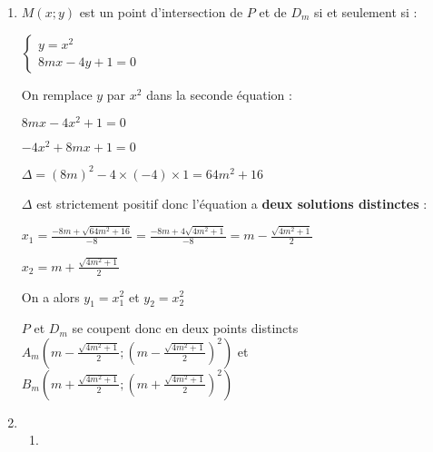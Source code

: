 \begin{corrige}
     \begin{enumerate}
          \item
          $M\left(x;y\right)$ est un point d'intersection de $P$ et de $D_{m}$ si et seulement si :
          \par
          $\begin{cases} y=x^{2} \\8mx-4y+1=0  \end{cases}$
          \par
          On remplace $y$ par $x^2$ dans la seconde équation :
          \par
          $8mx-4x^{2}+1=0$
          \par
          $-4x^{2}+8mx+1=0$
          \par
          $\Delta =\left(8m\right)^{2}-4 \times (-4) \times 1=64m^{2}+16$
          \par
          $\Delta $ est strictement positif donc l'équation a \textbf{deux solutions distinctes} :
          \par
          $x_{1}=\frac{-8m+\sqrt{64m^{2}+16}}{-8}=\frac{-8m+4\sqrt{4m^{2}+1}}{-8}=m-\frac{\sqrt{4m^{2}+1}}{2}$
          \par
          $x_{2}=m+\frac{\sqrt{4m^{2}+1}}{2}$
          \par
          On a alors $y_{1}=x_{1}^{2}$ et $y_{2}=x_{2}^{2}$
          \par
          $P$ et $D_{m}$ se coupent donc en deux points distincts $A_m\left( m-\frac{\sqrt{4m^{2}+1}}{2} ; \left(m-\frac{\sqrt{4m^{2}+1}}{2}\right)^{2}  \right)$ et $B_m\left(m+\frac{\sqrt{4m^{2}+1}}{2} ; \left(m+\frac{\sqrt{4m^{2}+1}}{2}\right)^{2}\right)$
          \item
          \begin{enumerate}
               \item


\end{enumerate}
\end{enumerate}
\end{corrige}
